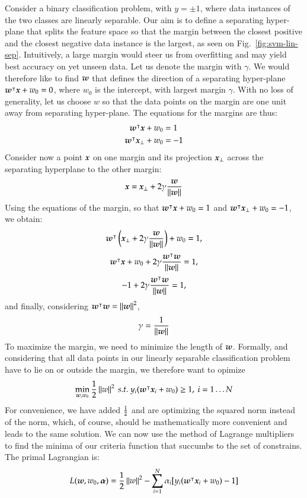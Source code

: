 \begin{refsection}
Consider a binary classification problem, with $y=\pm 1$, where data instances of the two classes are linearly separable. Our aim is to define a separating hyper-plane that splits the feature space so that the margin between the closest positive and the closest negative data instance is the largest, as seen on Fig.~\ref{fig:svm-lin-sep}. Intuitively, a large margin would steer us from overfitting and may yield best accuracy on yet unseen data. Let us denote the margin with $\gamma$. We would therefore like to find $\boldsymbol{w}$ that defines the direction of a separating hyper-plane $\boldsymbol{w}^\intercal\boldsymbol{x}+w_0=0$, where $w_0$ is the intercept, with largest margin $\gamma$. With no loss of generality, let us choose $w$ so that the data points on the margin are one unit away from separating hyper-plane. The equations for the margins are thus:
\begin{align*}
\boldsymbol{w}^\intercal\boldsymbol{x}+w_0 &= 1 \\
\boldsymbol{w}^\intercal\boldsymbol{x}_\perp+w_0 &= -1 \\
\end{align*}
Consider now a point $\boldsymbol{x}$ on one margin and its projection $\boldsymbol{x}_\perp$ across the separating hyperplane to the other margin:
$$ \boldsymbol{x} = \boldsymbol{x}_\perp + 2\gamma {\boldsymbol{w}\over\left\lVert\boldsymbol{w}\right\rVert} $$
Using the equations of the margin, so that $\boldsymbol{w}^\intercal\boldsymbol{x}+w_0 = 1$ and $\boldsymbol{w}^\intercal\boldsymbol{x}_\perp+w_0 = -1$, we obtain:
$$ \boldsymbol{w}^\intercal\left(\boldsymbol{x}_\perp + 2\gamma {\boldsymbol{w}\over\left\lVert\boldsymbol{w}\right\rVert}\right) + w_0=1, $$
$$ \boldsymbol{w}^\intercal\boldsymbol{x} + w_0 + 2\gamma {\boldsymbol{w}^\intercal\boldsymbol{w}\over\left\lVert\boldsymbol{w}\right\rVert}
= 1, $$
$$ -1 + 2\gamma {\boldsymbol{w}^\intercal\boldsymbol{w}\over\left\lVert\boldsymbol{w}\right\rVert}
= 1, $$
and finally, considering $\boldsymbol{w}^\intercal\boldsymbol{w}=\left\lVert\boldsymbol{w}\right\rVert^2 $,
$$ \gamma = {1\over\left\lVert\boldsymbol{w}\right\rVert} $$
To maximize the margin, we need to minimize the length of $\boldsymbol{w}$. Formally, and considering that all data points in our linearly separable classification problem have to lie on or outside the margin, we therefore want to opimize
$$\min_{\vect{w},w_0} {1\over 2}\norm{w}^2\ s.t.\ y_i(\vect{w}^\tr \vect{x}_i+w_0)\geq 1,\ i=1\ldots N$$
For convenience, we have added $1\over 2$ and are optimizing the squared norm instead of the norm, which, of course, should be mathematically more convenient and leads to the same solution. We can now use the method of Lagrange multipliers to find the minima of our criteria function that succumbs to the set of constrains. The primal Lagrangian is:
$$ L(\boldsymbol{w},w_0,\boldsymbol{\alpha})={1\over 2}\left\lVert w\right\rVert^2 - \sum_{i=1}^N \alpha_i [y_i(\boldsymbol{w}^\intercal \boldsymbol{x}_i+w_0)-1] $$

\end{refsection}
